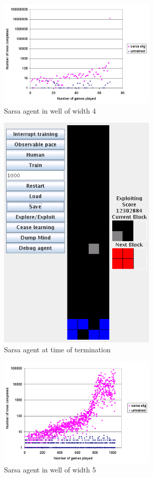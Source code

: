 \documentclass{rucsthesis}
\begin{document}
\begin{figure}[h]
\centering
\includegraphics[width=3in]{sarsaeligredtet4well.png}
\caption{Sarsa agent in well of width 4}
\label{fig:comparemelax}
\end{figure}

\begin{figure}[h]
\centering
\includegraphics[width=3in]{sarsaelig4term.png}
\caption{Sarsa agent at time of termination}
\label{fig:comparemelax}
\end{figure}

\begin{figure}[h]
\centering
\includegraphics[width=3in]{sarsaeligredtet5well.png}
\caption{Sarsa agent in well of width 5}
\label{fig:comparemelax}
\end{figure}
\end{document}
